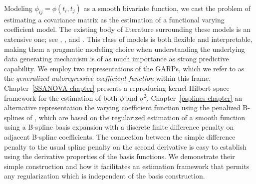 \bigskip

Modeling $\phi_{ij} = \phi\left(t_i, t_j\right)$ as a smooth bivariate function, we cast the problem of estimating a covariance matrix as the estimation of a functional varying coefficient model. The existing body of literature surrounding these models is an extensive one; see \cite{csenturk2008generalized}, \cite{csenturk2013modeling}, and \cite{noh2010sparse}. This class of models is both flexible and interpretable, making them a pragmatic modeling choice when understanding the underlying data generating mechanism is of as much importance as strong predictive capability. We employ two representations of the GARPs, which we refer to as the \textit{generalized autoregressive coefficient function} within this frame. Chapter~\ref{SSANOVA-chapter} presents a reproducing kernel Hilbert space framework for the estimation of both $\phi$ and $\sigma^2$. Chapter~\ref{psplines-chapter} an alternative representation the varying coefficient function using the penalized B-splines of \cite{eilers1996flexible}, which are based on the regularized estimation of a smooth function using a B-spline basis expansion with a discrete finite difference penalty on adjacent B-spline coefficients. The  connection between the simple difference penalty to the usual spline penalty on the second derivative is easy to establish using the derivative properties of the basis functions. We demonstrate their simple construction and how it facilitates an estimation framework that permits any regularization which is independent of the basis construction.


